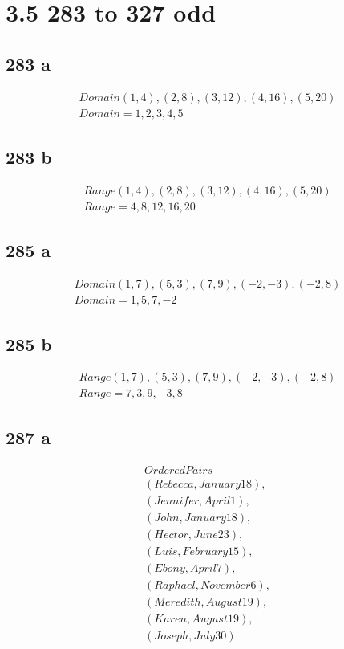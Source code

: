 \documentclass{article}
\begin{document}
    \section*{3.5 283 to 327 odd}
    \subsection*{283 a}
        \begin{align*}
            Domain {(1,4), (2,8), (3,12), (4,16), (5,20) }\\
            \boxed{Domain = {1, 2, 3, 4, 5}}
        \end{align*}

    \subsection*{283 b}
    \begin{align*}
        Range {(1,4), (2,8), (3,12), (4,16), (5,20) }\\
        \boxed{Range = {4, 8, 12, 16, 20}}
    \end{align*}

    \subsection*{285 a}
    \begin{align*}
        Domain {(1,7), (5,3), (7,9), (-2,-3), (-2,8)}\\
        \boxed{Domain = {1, 5, 7, -2}}
    \end{align*}

    \subsection*{285 b}
    \begin{align*}
        Range {(1,7), (5,3), (7,9), (-2,-3), (-2,8)}\\
        \boxed{Range = {7, 3,  9, -3, 8}}
    \end{align*}

    \subsection*{287 a}
    \begin{align*}
        Ordered Pairs \\
        (Rebecca, January 18), \\
        (Jennifer, April 1),\\
        (John, January 18),\\
        (Hector, June 23),\\
        (Luis, February 15),\\
        (Ebony, April 7),\\
        (Raphael, November 6),\\
        (Meredith, August 19),\\
        (Karen, August 19),\\
        (Joseph, July 30)
    \end{align*}
\end{document}
